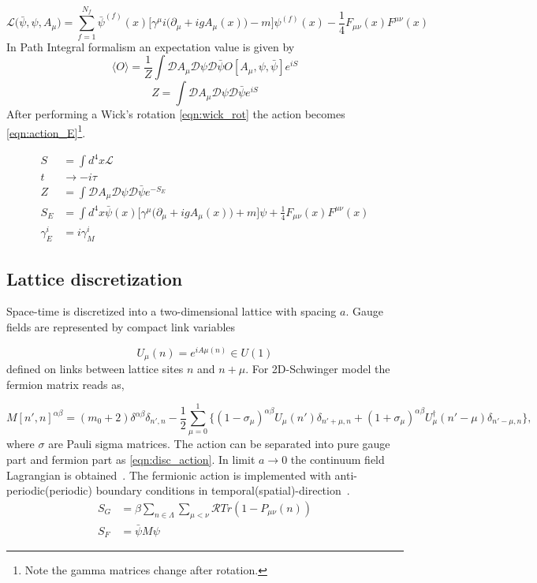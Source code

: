 \documentclass[11pt,titlepage]{article}
\begin{document}
\begin{equation}\label{eqn:qed_full}
    \mathcal{L}\big(\bar{\psi},\psi,A_\mu\big)
    =
    \sum_{f=1}^{N_f}
    \bar{\psi}^{(f)}(x)\Big[\gamma^\mu i \big(\partial_\mu + i g A_\mu(x)\big) - m\Big]\psi^{(f)}(x)
    -\frac{1}{4} F_{\mu\nu}(x)F^{\mu\nu}(x)
\end{equation}
In Path Integral formalism an expectation value is given by
\begin{equation}
    \langle O \rangle = \frac{1}{Z} \int \mathcal{D}A_\mu\mathcal{D}\psi\mathcal{D}\bar{\psi} O[A_\mu,\psi,\bar{\psi}] e^{iS}
\end{equation}
\begin{equation}
    Z = \int \mathcal{D}A_\mu\mathcal{D}\psi\mathcal{D}\bar{\psi} e^{iS}
\end{equation}
After performing a Wick's rotation \cref{eqn:wick_rot} the action becomes \cref{eqn:action_E}\footnote{Note the gamma matrices change after rotation.}.

\begin{align}
    S &= \int d^4x \mathcal {L} \\
    t &\to -i\tau \label{eqn:wick_rot}\\
    Z &= \int \mathcal{D}A_\mu\mathcal{D}\psi\mathcal{D}\bar{\psi} e^{-S_E} \\
    S_E &= \int d^4x  
    \bar{\psi}(x)\Big[\gamma^\mu\big(\partial_\mu + i g A_\mu(x)\big) + m\Big]\psi + \frac{1}{4} F_{\mu\nu}(x)F^{\mu\nu}(x) \label{eqn:action_E}\\
    \gamma_E^i &= i \gamma_M^i
\end{align}
\subsection{Lattice discretization}
Space-time is discretized into a two-dimensional lattice with spacing $a$. 
Gauge fields are represented by compact link variables

\begin{equation}
U_\mu(n) = e^{iA\mu(n)} \in U(1)
\end{equation}
defined on links between lattice sites $n$ and $n + \mu$.
For 2D-Schwinger model the fermion matrix reads as,

\begin{equation}
     M[n',n]^{\alpha\beta} = (m_0+2)\delta^{\alpha\beta}\delta_{n',n} -\frac{1}{2}\sum\limits_{\mu=0}^{1}\{(1-\sigma_\mu)^{\alpha\beta}U_{\mu}(n')\delta_{n'+\mu,n} +
        (1+\sigma_\mu)^{\alpha\beta}U^{\dagger}_{\mu}(n'-\mu)\delta_{n'-\mu,n}  \},
\end{equation}
where $\sigma$ are Pauli sigma matrices. The action can be separated into pure gauge part and fermion part as \cref{eqn:disc_action}. 
In limit $a \to 0$ the continuum field Lagrangian is obtained~\cite{gupta1998introduction}. The fermionic action is implemented with 
anti-periodic(periodic) boundary conditions in temporal(spatial)-direction~\cite{rothe2012lattice}.
\begin{align}\label{eqn:disc_action}
    S_G &= \beta\sum_{n\in \Lambda}\sum_{\mu<\nu} \mathcal{R}Tr(1-P_{\mu\nu}(n))\\
    S_F &= \bar{\psi} M \psi
\end{align}
\end{document}
